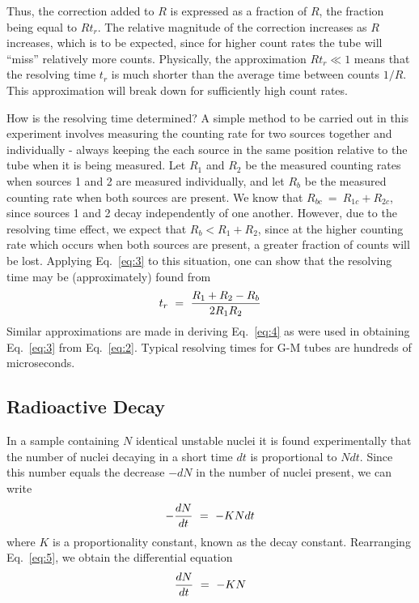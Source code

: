 \documentclass{article}
\begin{document}
Thus, the correction added to $R$ is expressed as a fraction of $R$, the
fraction being equal to $Rt_{r}$.  The relative
magnitude of the correction increases as $R$ increases, which is to be
expected, since for higher count rates the tube will
``miss'' relatively more counts.
Physically, the approximation
$Rt_{r} \ll 1$ means that the resolving
time $t_{r}$ is much shorter than the average time between
counts $1/R$.  This approximation will break down for sufficiently high
count rates.

How is the resolving time determined?  A simple method to be carried
out in this experiment involves measuring the counting rate for two
sources together and individually - always keeping the each source in
the same position relative to the tube when it is being measured.  Let
$R_{1}$ and $R_{2}$ be the measured counting
rates when sources 1 and 2 are measured individually, and let
$R_{b}$ be the measured counting rate when both sources are
present. We know that $R_{bc} ~=~ R_{1c} + R_{2c }$,
since sources 1 and 2 decay independently of one
another.  However, due to the resolving time effect, we expect that
$R_{b} < R_{1} + R_{2}$, since at the higher counting rate which occurs when both sources are
present, a greater fraction of counts will be lost.  Applying  Eq.~\ref{eq:3}
to this situation, one can show that the resolving time may be
(approximately) found from
\begin{equation}
t_r ~=~ { R_1 + R_2 - R_b \over 2 R_1 R_2 }
\label{eq:4}
\end{equation}
Similar approximations are made in deriving Eq.~\ref{eq:4} as were used in
obtaining Eq.~\ref{eq:3} from Eq.~\ref{eq:2}.  Typical resolving times for G-M tubes
are hundreds of microseconds.

\subsection{Radioactive Decay}
\label{sec:rad-decay}

In a sample containing $N$ identical unstable nuclei it is found
experimentally that the number of nuclei decaying in a short time $dt$ is
proportional to $N dt$.  Since this number equals the decrease $-dN$
in the number of nuclei present, we can write
\begin{equation}
- {dN \over dt} ~=~ -K N dt
\label{eq:5}
\end{equation}
where $K$ is a proportionality constant, known as the decay constant.
Rearranging Eq.~\ref{eq:5}, we obtain the differential equation
\begin{equation}
{dN \over dt} ~=~ -K N
\label{eq:6}
\end{equation}
\end{document}
